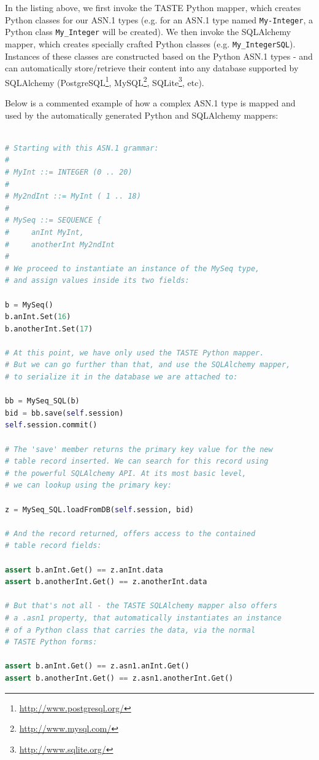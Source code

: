\documentclass[11pt]{book}
\begin{document}
In the listing above, we first invoke the TASTE Python mapper, which creates Python classes for our ASN.1 types (e.g. for an ASN.1 type named {\tt My-Integer}, a Python class {\tt My\_Integer} will be created). We then invoke the SQLAlchemy mapper, which creates specially crafted Python classes (e.g. {\tt My\_IntegerSQL}). Instances of these classes are constructed based on the Python ASN.1 types - and can automatically store/retrieve their content into any database supported by SQLAlchemy (PostgreSQL\footnote{\url{http://www.postgresql.org/}}, MySQL\footnote{\url{http://www.mysql.com/}}, SQLite\footnote{\url{http://www.sqlite.org/}}, etc).

Below is a commented example of how a complex ASN.1 type is mapped and used by the automatically generated Python and SQLAlchemy mappers:

\begin{lstlisting}[language=Python]

# Starting with this ASN.1 grammar:
#
# MyInt ::= INTEGER (0 .. 20)
# 
# My2ndInt ::= MyInt ( 1 .. 18)
# 
# MySeq ::= SEQUENCE {
#     anInt MyInt,
#     anotherInt My2ndInt
#
# We proceed to instantiate an instance of the MySeq type,
# and assign values inside its two fields:

b = MySeq()
b.anInt.Set(16)
b.anotherInt.Set(17)

# At this point, we have only used the TASTE Python mapper.
# But we can go further than that, and use the SQLAlchemy mapper,
# to serialize it in the database we are attached to:

bb = MySeq_SQL(b)
bid = bb.save(self.session)
self.session.commit()

# The 'save' member returns the primary key value for the new
# table record inserted. We can search for this record using
# the powerful SQLAlchemy API. At its most basic level,
# we can lookup using the primary key:

z = MySeq_SQL.loadFromDB(self.session, bid)

# And the record returned, offers access to the contained
# table record fields:

assert b.anInt.Get() == z.anInt.data
assert b.anotherInt.Get() == z.anotherInt.data

# But that's not all - the TASTE SQLAlchemy mapper also offers
# a .asn1 property, that automatically instantiates an instance
# of a Python class that carries the data, via the normal
# TASTE Python forms:

assert b.anInt.Get() == z.asn1.anInt.Get()
assert b.anotherInt.Get() == z.asn1.anotherInt.Get()
\end{lstlisting}
\end{document}

